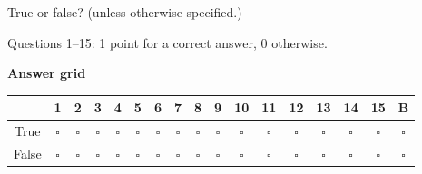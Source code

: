 \documentclass[a4paper]{article}
\begin{document}
\pagestyle{empty}
\thispagestyle{fancy}

True or false? (unless otherwise specified.)
\ifdefined\showsolutions
{\small\color{blue!60!black}Questions 1--15: 1 point for a correct answer, 0 otherwise.\par}
\fi

\begin{center}
    \textbf{Answer grid}\par\smallskip

    \smallskip
    \normalsize
    \renewcommand{\arraystretch}{1.35}
    \begin{tabular}{|c|*{16}{c|}}
        \hline
        & 1 & 2 & 3 & 4 & 5 & 6 & 7 & 8 & 9 & 10 & 11 & 12 & 13 & 14 & 15 & B \\
        \hline
        True  & $\square$ & $\square$ & $\square$ & $\square$ & $\square$ & $\square$ & $\square$ & $\square$ & $\square$ & $\square$ & $\square$ & $\square$ & $\square$ & $\square$ & $\square$ & $\square$ \\
        False & $\square$ & $\square$ & $\square$ & $\square$ & $\square$ & $\square$ & $\square$ & $\square$ & $\square$ & $\square$ & $\square$ & $\square$ & $\square$ & $\square$ & $\square$ & $\square$ \\
        \hline
    \end{tabular}
\end{center}
\end{document}

